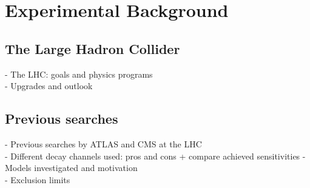 
\chapter{Experimental Background}
\label{chapter:experimental}

\section{The Large Hadron Collider}
\label{section:LHC}

- The LHC: goals and physics programs \\
- Upgrades and outlook

\section{Previous searches}
\label{section:previous_searches}

- Previous searches by ATLAS and CMS at the LHC \\
- Different decay channels used: pros and cons + compare achieved sensitivities
- Models investigated and motivation \\
- Exclusion limits


